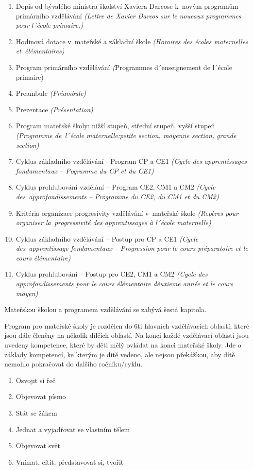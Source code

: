 	\begin{enumerate}[1]
		\setlength\itemsep{-2mm}
		\item Dopis od bývalého ministra školství Xaviera Darcose k novým programům primárního vzdělávání \textit{(Lettre de Xavier Darcos sur le noueaux programmes pour l´école primaire.)}
		\item Hodinová dotace v mateřské a základní škole \textit{(Horaires des écoles maternelles et élémentaires)}
		\item Program primárního vzdělávání \textit({Programmes d´enseignement  de l´école primaire)}
		\item Preambule \textit{(Préambule)}
		\item Prezentace \textit{(Présentation)}
		\item Program mateřské školy: nižší stupeň, střední stupeň, vyšší stupeň \textit{(Programme de l´école maternelle:petite section, moyenne section, grande section)}
		\item Cyklus základního vzdělávání - Program CP a CE1 \textit{(Cycle des apprentissages fondamentaux – Pogramme du CP et du CE1)}
		\item Cyklus prohlubování vzdělání – Program CE2, CM1 a CM2 \textit{(Cycle des approfondissements – Programme du CE2, du CM1 et du CM2)}
		\item Kritéria organizace progresivity vzdělávání v mateřské škole \textit{(Repères pour organiser la progressivité des apprentissages à l´école maternelle)}
		\item Cyklus základního vzdělávání – Postup pro CP a CE1 \textit{(Cycle des apprentissage fondamentaux – Progression pour le cours préparatoire et le cours élémentaire)}
		\item Cyklus prohlubování – Postup pro CE2, CM1 a CM2 \textit{(Cycle des approfondissements pour le cours élémentaire dèuxieme année et le cours moyen)}
	\end{enumerate}


	Mateřskou školou a programem vzdělávání se zabývá šestá kapitola.

	Program pro mateřské školy je rozdělen do 6ti hlavních vzdělávacích oblastí, které jsou dále členěny na několik dílčích oblastí.
	Na konci každé vzdělávací oblasti jsou uvedeny kompetence, které by děti mělý ovládat na konci mateřské školy. Jde o základy kompetencí, ke kterým je dítě vedeno, ale nejsou překážkou, aby dítě nemohlo pokračovat do dalšího ročníku/cyklu.


	\begin{enumerate}[1]
		\setlength\itemsep{-2mm}
		\item Osvojit si řeč 
		\item Objevovat písmo 
		\item Stát se žákem 
		\item Jednat a vyjadřovat se vlastním tělem 
		\item Objevovat svět
		\item Vnímat, cítit, představovat si, tvořit
	\end{enumerate}

